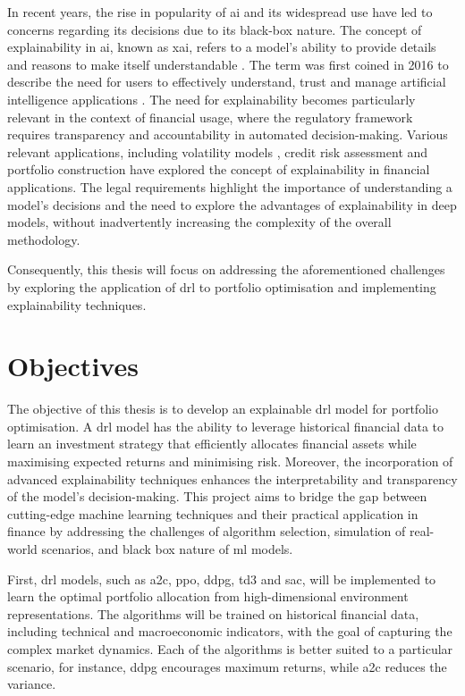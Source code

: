 In recent years, the rise in popularity of \acrfull{ai} and its widespread use have led to concerns regarding its decisions due to its black-box nature. The concept of explainability in \acrshort{ai}, known as \acrfull{xai}, refers to a model's ability to provide details and reasons to make itself understandable \cite{BarredoArrieta2019}. The term was first coined in 2016 to describe the need for users to effectively understand, trust and manage artificial intelligence applications \cite{Gunning2019}. The need for explainability becomes particularly relevant in the context of financial usage, where the regulatory framework requires transparency and accountability in automated decision-making. Various relevant applications, including volatility models \cite{Brigo2021}, credit risk assessment \cite{GarciaCespedes2025} and portfolio construction \cite{Cortes2024} have explored the concept of explainability in financial applications. The legal requirements highlight the importance of understanding a model's decisions and the need to explore the advantages of explainability in deep models, without inadvertently increasing the complexity of the overall methodology.

Consequently, this thesis will focus on addressing the aforementioned challenges by exploring the application of \acrfull{drl} to portfolio optimisation and implementing explainability techniques.

\section{Objectives} \label{sec:introduction-objectives}

The objective of this thesis is to develop an explainable \acrlong{drl} model for portfolio optimisation. A \acrshort{drl} model has the ability to leverage historical financial data to learn an investment strategy that efficiently allocates financial assets while maximising expected returns and minimising risk. Moreover, the incorporation of advanced explainability techniques enhances the interpretability and transparency of the model's decision-making. This project aims to bridge the gap between cutting-edge machine learning techniques and their practical application in finance by addressing the challenges of algorithm selection, simulation of real-world scenarios, and black box nature of \acrshort{ml} models.

First, \acrshort{drl} models, such as \acrfull{a2c}, \acrfull{ppo}, \acrfull{ddpg}, \acrfull{td3} and \acrfull{sac}, will be implemented to learn the optimal portfolio allocation from high-dimensional environment representations. The algorithms will be trained on historical financial data, including technical and macroeconomic indicators, with the goal of capturing the complex market dynamics. Each of the algorithms is better suited to a particular scenario, for instance, \acrshort{ddpg} encourages maximum returns, while \acrshort{a2c} reduces the variance.

